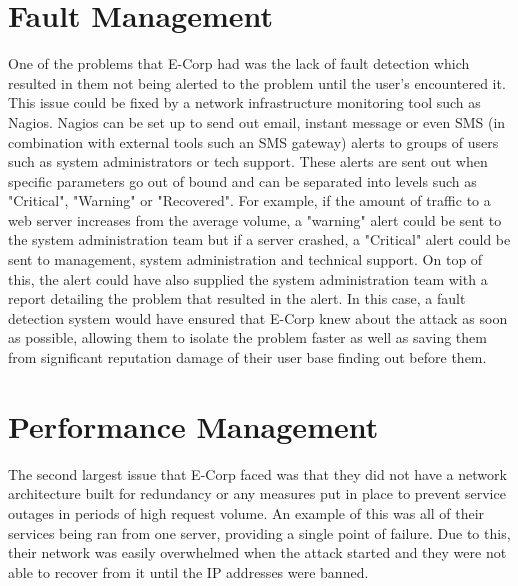 \documentclass[]{report}
\begin{document}
\section*{Fault Management}
One of the problems that E-Corp had was the lack of fault detection which resulted in them not being alerted to the problem until the user's encountered it. This issue could be fixed by a network infrastructure monitoring tool such as Nagios. Nagios can be set up to send out email, instant message or even SMS (in combination with external tools such an SMS gateway) alerts to groups of users such as system administrators or tech support. These alerts are sent out when specific parameters go out of bound and can be separated into levels such as "Critical", "Warning" or "Recovered". For example, if the amount of traffic to a web server increases from the average volume, a "warning" alert could be sent to the system administration team but if a server crashed, a "Critical" alert could be sent to management, system administration and technical support. On top of this, the alert could have also supplied the system administration team with a report detailing the problem that resulted in the alert. In this case, a fault detection system would have ensured that E-Corp knew about the attack as soon as possible, allowing them to isolate the problem faster as well as saving them from significant reputation damage of their user base finding out before them.

\section*{Performance Management}
The second largest issue that E-Corp faced was that they did not have a network architecture built for redundancy or any measures put in place to prevent service outages in periods of high request volume. An example of this was all of their services being ran from one server, providing a single point of failure. Due to this, their network was easily overwhelmed when the attack started and they were not able to recover from it until the IP addresses were banned. 
\end{document}
